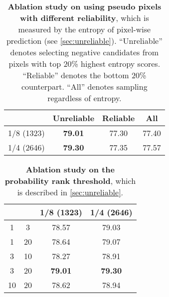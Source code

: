 \documentclass[10pt, twocolumn, letterpaper]{article}
\begin{document}
\begin{table}[t]
\centering
\caption{
\textbf{Ablation study on using pseudo pixels with different reliability}, which is measured by the entropy of pixel-wise prediction (see \cref{sec:unreliable}). 
``Unreliable'' denotes selecting negative candidates from pixels with top 20\% highest entropy scores.
``Reliable'' denotes the bottom 20\% counterpart. 
``All'' denotes sampling regardless of entropy.
}
\label{tab:abalation_reliable}
\vspace{-5pt}
\setlength{\tabcolsep}{10pt}
\begin{tabular}{cccc}
\toprule
 & Unreliable & Reliable & All  \\
\midrule
1/8 (1323) & \textbf{79.01} & 77.30 & 77.40 \\
1/4 (2646) & \textbf{79.30} & 77.35 & 77.57 \\
\bottomrule
\end{tabular}
\vspace{-5pt}
\end{table}


\begin{table}[t]
\centering
\caption{
\textbf{Ablation study on the probability rank threshold}, which is described in \cref{sec:unreliable}.
}
\label{tab:abalation_probability_rank}
\vspace{-5pt}
\setlength{\tabcolsep}{16pt}
\begin{tabular}{cccc}
\toprule
   &  &  1/8 (1323) & 1/4 (2646)  \\
\midrule
 1 & 3&78.57  &79.03\\
 1 & 20&78.64  &79.07\\
 3 & 10 &78.27  &78.91\\
 3 & 20 &\textbf{79.01}  &\textbf{79.30} \\
 10 & 20 &78.62 &78.94\\
\bottomrule
\end{tabular}
\vspace{-5pt}
\end{table}
\end{document}

